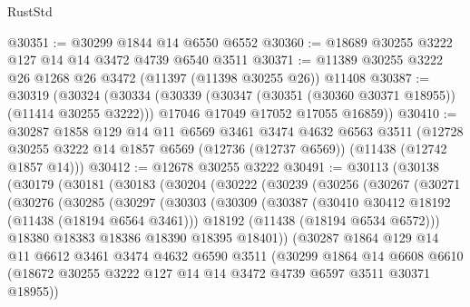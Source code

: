 \begin{lexlean}{RustStd}
\begin{coremodule}
@30351 := @30299 @1844 @14 @6550 @6552
@30360 := @18689 @30255 @3222 @127 @14 @14 @3472 @4739 @6540 @3511
@30371 := @11389 @30255 @3222 @26 @1268 @26 @3472 (@11397 (@11398 @30255 @26)) @11408
@30387 := @30319
    (@30324
      (@30334
        (@30339 (@30347 (@30351 (@30360 @30371 @18955)) (@11414 @30255 @3222)))
        @17046
        @17049
        @17052
        @17055
        @16859))
@30410 := @30287
    @1858
    @129
    @14
    @11
    @6569
    @3461
    @3474
    @4632
    @6563
    @3511
    (@12728 @30255 @3222 @14 @1857 @6569 (@12736 (@12737 @6569)) (@11438 (@12742 @1857 @14)))
@30412 := @12678 @30255 @3222
@30491 := @30113
    (@30138
      (@30179
        (@30181
          (@30183
            (@30204
              (@30222
                (@30239
                  (@30256
                    (@30267
                      (@30271
                        (@30276
                          (@30285
                            (@30297
                              (@30303
                                (@30309
                                  (@30387
                                    (@30410 @30412 @18192 (@11438 (@18194 @6564 @3461)))
                                    @18192
                                    (@11438 (@18194 @6534 @6572)))
                                  @18380
                                  @18383
                                  @18386
                                  @18390
                                  @18395
                                  @18401))
                              (@30287
                                @1864
                                @129
                                @14
                                @11
                                @6612
                                @3461
                                @3474
                                @4632
                                @6590
                                @3511
                                (@30299
                                  @1864
                                  @14
                                  @6608
                                  @6610
                                  (@18672
                                    @30255
                                    @3222
                                    @127
                                    @14
                                    @14
                                    @3472
                                    @4739
                                    @6597
                                    @3511
                                    @30371
                                    @18955))

\end{coremodule}
\end{lexlean}
